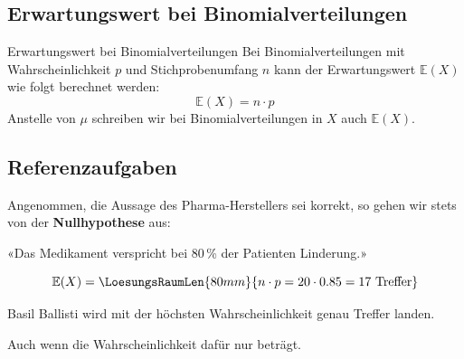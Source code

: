 \subsection*{Erwartungswert bei Binomialverteilungen}

\begin{gesetz}{Erwartungswert bei Binomialverteilungen}{}
  Bei Binomialverteilungen mit Wahrscheinlichkeit $p$ und
  Stichprobenumfang $n$ kann der Erwartungswert $\mathbb{E}(X)$ wie folgt
  berechnet werden:
  $$\mathbb{E}(X) = n\cdot{}p$$
  Anstelle von $\mu$ schreiben wir bei Binomialverteilungen in $X$ auch $\mathbb{E}(X)$.
\end{gesetz}


\subsection*{Referenzaufgaben}


Angenommen, die Aussage des Pharma-Herstellers sei korrekt, so gehen
wir stets von der \textbf{Nullhypothese} aus:

«Das Medikament verspricht bei 80\,\% der Patienten Linderung.»




$$\mathbb{E}(X) = \LoesungsRaumLen{80mm}{n\cdot{}p = 20 \cdot{} 0.85 = 17 \text{ Treffer}}$$

Basil Ballisti wird mit der höchsten Wahrscheinlichkeit genau
 Treffer landen.

Auch wenn die
Wahrscheinlichkeit dafür nur  beträgt.
\newpage
